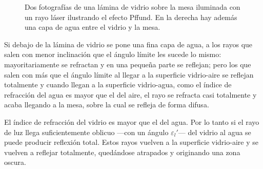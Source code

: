 \documentclass[12pt]{article}
\numberwithin{table}{section}
\numberwithin{figure}{section}
\numberwithin{equation}{section}
\begin{document}
\begin{figure}[!ht]
\begin{center}
\caption{Dos fotografías de una lámina de vidrio sobre la mesa iluminada con un rayo láser ilustrando el efecto Pffund. En la derecha hay además una capa de agua entre el vidrio y la mesa.}
\label{P2PffFotoVidrio}
\end{center}
\end{figure}

Si debajo de la lámina de vidrio se pone una fina capa de agua, a los rayos que salen con menor inclinación que el ángulo límite les sucede lo mismo: mayoritariamente se refractan y en una pequeña parte se reflejan; pero los que salen con más que el ángulo límite al llegar a la superficie vidrio-aire se reflejan totalmente y cuando llegan a la superficie vidrio-agua, como el índice de refracción del agua es mayor que el del aire, el rayo se refracta casi totalmente y acaba llegando a la mesa, sobre la cual se refleja de forma difusa.

El índice de refracción del vidrio es mayor que el del agua. Por lo tanto si el rayo de luz llega suficientemente oblicuo ---con un ángulo $\varepsilon_l'$--- del vidrio al agua se puede producir reflexión total. Estos rayos vuelven a la superficie vidrio-aire y se vuelven a reflejar totalmente, quedándose atrapados y originando una zona oscura.
\end{document}
